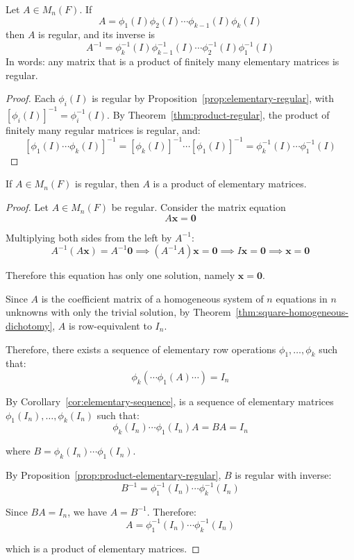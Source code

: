 \begin{proposition}\label{prop:product-elementary-regular}
    Let $A \in M_n(F)$. If
    \[
    A = \phi_1(I) \phi_2(I) \cdots \phi_{k-1}(I) \phi_k(I)
    \]
    then $A$ is regular, and its inverse is
    \[
    A^{-1} = \phi_k^{-1}(I) \phi_{k-1}^{-1}(I) \cdots \phi_2^{-1}(I) \phi_1^{-1}(I)
    \]
    In words: any matrix that is a product of finitely many elementary matrices is regular.
\end{proposition}

\begin{proof}
    Each $\phi_i(I)$ is regular by Proposition~\ref{prop:elementary-regular}, with $[\phi_i(I)]^{-1} = \phi_i^{-1}(I)$. By Theorem~\ref{thm:product-regular}, the product of finitely many regular matrices is regular, and:
    \[
    [\phi_1(I) \cdots \phi_k(I)]^{-1} = [\phi_k(I)]^{-1} \cdots [\phi_1(I)]^{-1} = \phi_k^{-1}(I) \cdots \phi_1^{-1}(I)
    \]
\end{proof}

\begin{theorem}\label{thm:regular-elementary-product}
    If $A \in M_n(F)$ is regular, then $A$ is a product of elementary matrices.
\end{theorem}

\begin{proof}
    Let $A \in M_n(F)$ be regular. Consider the matrix equation
    \[
    A\mathbf{x} = \mathbf{0}
    \]
    
    Multiplying both sides from the left by $A^{-1}$:
    \[
    A^{-1}(A\mathbf{x}) = A^{-1}\mathbf{0} \implies (A^{-1}A)\mathbf{x} = \mathbf{0} \implies I\mathbf{x} = \mathbf{0} \implies \mathbf{x} = \mathbf{0}
    \]
    
    Therefore this equation has only one solution, namely $\mathbf{x} = \mathbf{0}$.
    
    Since $A$ is the coefficient matrix of a homogeneous system of $n$ equations in $n$ unknowns with only the trivial solution, by Theorem~\ref{thm:square-homogeneous-dichotomy}, $A$ is row-equivalent to $I_n$.
    
    Therefore, there exists a sequence of elementary row operations $\phi_1, \ldots, \phi_k$ such that:
    \[
    \phi_k(\cdots \phi_1(A) \cdots) = I_n
    \]
    
    By Corollary~\ref{cor:elementary-sequence}, is a sequence of elementary matrices $\phi_1(I_n), \ldots, \phi_k(I_n)$ such that:
    \[
    \phi_k(I_n) \cdots \phi_1(I_n) A = BA = I_n
    \]
    
    where $B = \phi_k(I_n) \cdots \phi_1(I_n)$.
    
    By Proposition~\ref{prop:product-elementary-regular}, $B$ is regular with inverse:
    \[
    B^{-1} = \phi_1^{-1}(I_n) \cdots \phi_k^{-1}(I_n)
    \]
    
    Since $BA = I_n$, we have $A = B^{-1}$. Therefore:
    \[
    A = \phi_1^{-1}(I_n) \cdots \phi_k^{-1}(I_n)
    \]
    
    which is a product of elementary matrices.
\end{proof}
